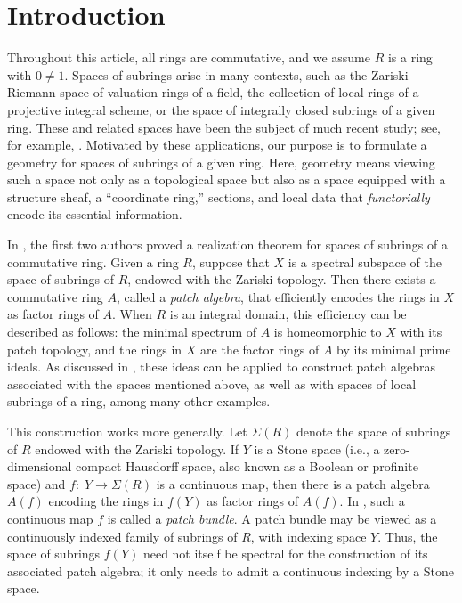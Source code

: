 \documentclass[11pt]{amsart}
\begin{document}

\maketitle

\begingroup
\small
\tableofcontents
\endgroup

\section{Introduction}

Throughout this article, all rings are commutative, and we assume $R$ is a ring with $0 \ne 1$.
Spaces of subrings arise in many contexts, such as the Zariski-Riemann space of valuation rings of a field, the collection of local rings of a projective integral scheme, or the space of integrally closed subrings of a given ring. These and related spaces have been the subject of much recent study; see, for example, {\cite{CamFin26, Fin, FFL, FFS, FinSpir20, HLOT24, SpiritoLoc, SpiritoIso22}}. 
Motivated by these applications, our purpose is to formulate a geometry for spaces of subrings of a given ring. Here, geometry means viewing such a space not only as a topological space but also as a space equipped with a structure sheaf, a ``coordinate ring,'' sections, and local data that {\it functorially} encode its essential information.  


In \cite{CosOlb}, the first two authors proved a realization theorem for spaces of subrings of a commutative ring. Given  a ring $R$, suppose that $X$ is a spectral subspace of the space of subrings of $R$, endowed with the Zariski topology. Then there exists a commutative ring $A$, called a {\it patch algebra}, that efficiently encodes the rings in $X$ as factor rings of $A$. When $R$ is an integral domain, this efficiency can be described as follows: the minimal spectrum of $A$ is homeomorphic to $X$  with its patch topology, and the rings in $X$ are the factor rings of $A$ by its minimal prime ideals. As discussed in \cite{CosOlb}, these ideas can be applied to construct patch algebras associated with the spaces mentioned above, as well as with spaces of local subrings of a ring, among many other examples.

This construction works more generally. Let $\Sigma(R)$ denote the space of subrings of $R$ endowed with the Zariski topology. If $Y$ is a Stone space (i.e., a zero-dimensional compact Hausdorff space, also known as a Boolean or profinite space) and $f\colon\; Y\rightarrow\Sigma(R)$ is a continuous map, then there is a patch algebra $A(f)$ encoding the rings in $f(Y)$ as factor rings of $A(f)$. In \cite{CosOlb}, such a continuous map $f$ is called a {\it patch bundle}. A patch bundle may be viewed as a continuously indexed family of subrings of $R$, with indexing space $Y$. Thus, the space of subrings $f(Y)$ need not itself be spectral for the construction of its associated patch algebra; it only needs to admit a continuous indexing by a Stone space.
\end{document}
